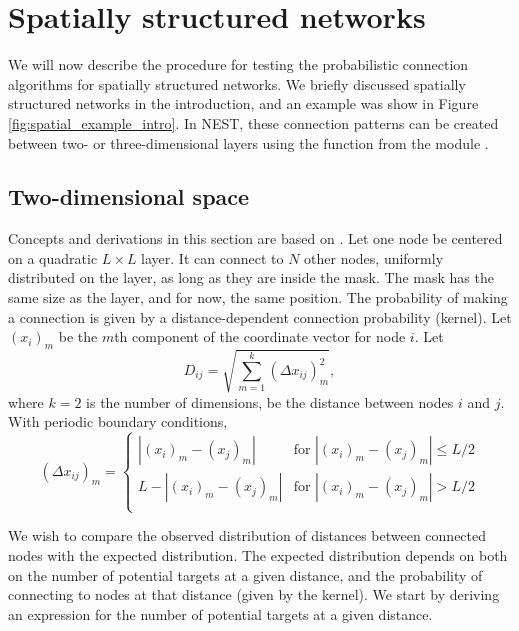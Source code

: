 \chapter{Spatially structured networks\label{ch:spatial}}

\graphicspath{{figs/spatial/}}


We will now describe the procedure for testing the probabilistic connection algorithms for spatially structured networks. We briefly discussed spatially structured networks in the introduction, and an example was show in Figure \ref{fig:spatial_example_intro}. In NEST, these connection patterns can be created between two- or three-dimensional layers using the function  from the  module .



\section{Two-dimensional space\label{sec:2D}}

Concepts and derivations in this section are based on . Let one node be centered on a quadratic $L \times L\label{eq:L}$ layer. It can connect to $N\label{eq:N}$ other nodes, uniformly distributed on the layer, as long as they are inside the mask. The mask has the same size as the layer, and for now, the same position. The probability of making a connection is given by a distance-dependent connection probability (kernel). Let $(x_i)_m$ be the $m$th component of the coordinate vector for node $i$. Let 
\begin{equation}\label{eq:Dij}
D_{ij} = \sqrt{\sum_{m=1}^k \left(\Delta x_{ij}\right)_m^2},
\end{equation}
where $k = 2$ is the number of dimensions, be the distance between nodes $i$ and $j$. With periodic boundary conditions, 
\begin{equation}
\left(\Delta x_{ij}\right)_m = 
\begin{cases}
|(x_i)_m - (x_j)_m| & \text{for } |(x_i)_m - (x_j)_m| \le L/2 \\
L - |(x_i)_m - (x_j)_m| & \text{for } |(x_i)_m - (x_j)_m| > L/2 \\
\end{cases}
\end{equation}

We wish to compare the observed distribution of distances between connected nodes with the expected distribution. The expected distribution depends on both on the number of potential targets at a given distance, and the probability of connecting to nodes at that distance (given by the kernel). We start by deriving an expression for the number of potential targets at a given distance. 

